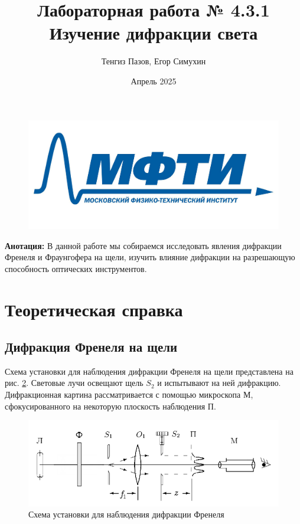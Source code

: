 \documentclass[a4paper,12pt]{article}
\begin{document}
\title{Лабораторная работа № 4.3.1\\ Изучение дифракции света}
\author{Тенгиз Пазов, Егор Симухин}

\date{Апрель 2025}
\maketitle
\begin{figure}[h!!]
	\centering
	\includegraphics[scale=0.25]{MIPT.jpg}
	\label{graph1}
\end{figure}


\newpage
\textbf{Анотация:} В данной работе мы собираемся исследовать явления дифракции Френеля и Фраунгофера на щели, изучить влияние дифракции на разрешающую способность оптических инструментов.
\section{Теоретическая справка}
\subsection{Дифракция Френеля на щели}

Схема установки для наблюдения дифракции Френеля на щели представлена на рис. \ref{labA}. Световые лучи освещают щель $ S_2 $ и испытывают на ней дифракцию. Дифракционная картина рассматривается с помощью микроскопа М, сфокусированного на некоторую плоскость наблюдения П.

\begin{figure}[H]
	\centering
	\includegraphics[scale=0.9]{Схема установки.png}
	\caption{Схема установки для наблюдения дифракции Френеля}
	\label{labA}
\end{figure}
\end{document}
